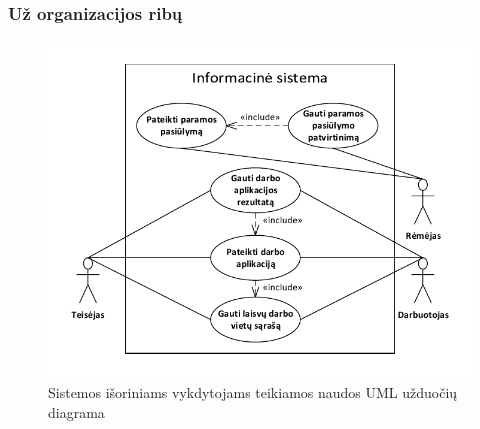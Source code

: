 \documentclass{VUMIFPSkursinis}
\begin{document}
    \subsubsection*{Už organizacijos ribų}
	    \begin{figure}[H]
        \centering
        \includegraphics[width=\textwidth]{img/ScenarijausUzduociuDiagrama2}
        \caption{Sistemos išoriniams vykdytojams teikiamos naudos UML užduočių diagrama}
        \label{fig:scenarijusIsoresVykdytojuUzduociuDiagrama}
      \end{figure}
\end{document}
